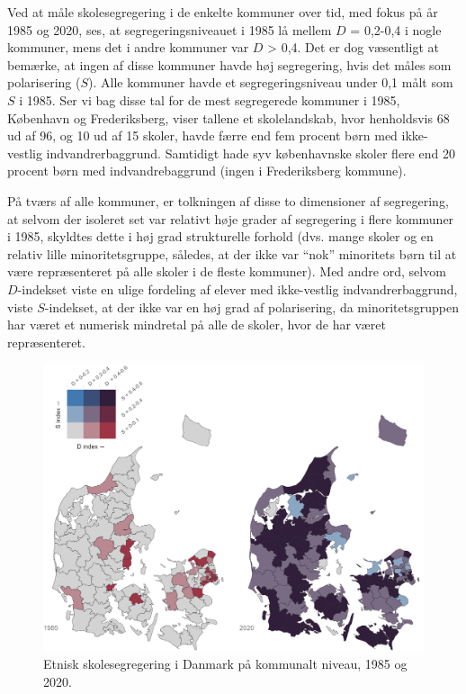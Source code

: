 \documentclass[
]{book}
\begin{document}
Ved at måle skolesegregering i de enkelte kommuner over tid, med fokus på år 1985 og 2020, ses, at segregeringsniveauet i 1985 lå mellem \(D\) = 0,2-0,4 i nogle kommuner, mens det i andre kommuner var \(D\) \textgreater{} 0,4. Det er dog væsentligt at bemærke, at ingen af disse kommuner havde høj segregering, hvis det måles som polarisering (\(S\)). Alle kommuner havde et segregeringsniveau under 0,1 målt som \(S\) i 1985. Ser vi bag disse tal for de mest segregerede kommuner i 1985, København og Frederiksberg, viser tallene et skolelandskab, hvor henholdsvis 68 ud af 96, og 10 ud af 15 skoler, havde færre end fem procent børn med ikke-vestlig indvandrerbaggrund. Samtidigt hade syv københavnske skoler flere end 20 procent børn med indvandrebaggrund (ingen i Frederiksberg kommune).

På tværs af alle kommuner, er tolkningen af disse to dimensioner af segregering, at selvom der isoleret set var relativt høje grader af segregering i flere kommuner i 1985, skyldtes dette i høj grad strukturelle forhold (dvs. mange skoler og en relativ lille minoritetsgruppe, således, at der ikke var ``nok'' minoritets børn til at være repræsenteret på alle skoler i de fleste kommuner). Med andre ord, selvom \(D\)-indekset viste en ulige fordeling af elever med ikke-vestlig indvandrerbaggrund, viste \(S\)-indekset, at der ikke var en høj grad af polarisering, da minoritetsgruppen har været et numerisk mindretal på alle de skoler, hvor de har været repræsenteret.

\begin{figure}
\includegraphics[width=1\linewidth]{images/Figur4-removebg} \caption{Etnisk skolesegregering i Danmark på kommunalt niveau, 1985 og 2020.}\label{fig:fig-4-3}
\end{figure}
\end{document}
